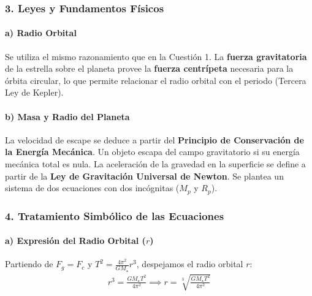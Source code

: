 \subsubsection*{3. Leyes y Fundamentos Físicos}
\paragraph*{a) Radio Orbital}
Se utiliza el mismo razonamiento que en la Cuestión 1. La \textbf{fuerza gravitatoria} de la estrella sobre el planeta provee la \textbf{fuerza centrípeta} necesaria para la órbita circular, lo que permite relacionar el radio orbital con el periodo (Tercera Ley de Kepler).

\paragraph*{b) Masa y Radio del Planeta}
La velocidad de escape se deduce a partir del \textbf{Principio de Conservación de la Energía Mecánica}. Un objeto escapa del campo gravitatorio si su energía mecánica total es nula. La aceleración de la gravedad en la superficie se define a partir de la \textbf{Ley de Gravitación Universal de Newton}. Se plantea un sistema de dos ecuaciones con dos incógnitas ($M_p$ y $R_p$).

\subsubsection*{4. Tratamiento Simbólico de las Ecuaciones}
\paragraph*{a) Expresión del Radio Orbital ($r$)}
Partiendo de $F_g = F_c$ y $T^2 = \frac{4\pi^2}{G M_{\star}} r^3$, despejamos el radio orbital $r$:
\begin{gather}
    r^3 = \frac{G M_{\star} T^2}{4\pi^2} \implies r = \sqrt[3]{\frac{G M_{\star} T^2}{4\pi^2}}
\end{gather}

